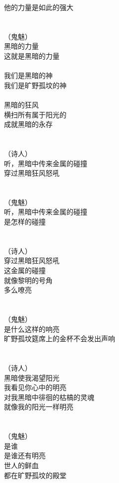 他的力量是如此的强大\\
\\
\\
（鬼魅）\\
黑暗的力量\\
这就是黑暗的力量\\
\\
我们是黑暗的神\\
我们是旷野孤坟的神\\
\\
黑暗的狂风\\
横扫所有属于阳光的\\
成就黑暗的永存\\
\\
\\
（诗人）\\
听，黑暗中传来金属的碰撞\\
穿过黑暗狂风怒吼\\
\\
\\
（鬼魅）\\
听，黑暗中传来金属的碰撞\\
是怎样的碰撞\\
\\
\\
（诗人）\\
穿过黑暗狂风怒吼\\
这金属的碰撞\\
就像黎明的号角\\
多么嘹亮\\
\\
\\
（鬼魅）\\
是什么这样的响亮\\
旷野孤坟筵席上的金杯不会发出声响\\
\\
\\
（诗人）\\
黑暗使我渴望阳光\\
我看见你心中的明亮\\
对我黑暗中徘徊的枯槁的灵魂\\
就像我的阳光一样明亮\\
\\
\\
（鬼魅）\\
是谁\\
是谁还有明亮\\
世人的鲜血\\
都在旷野孤坟的殿堂\\
\\
